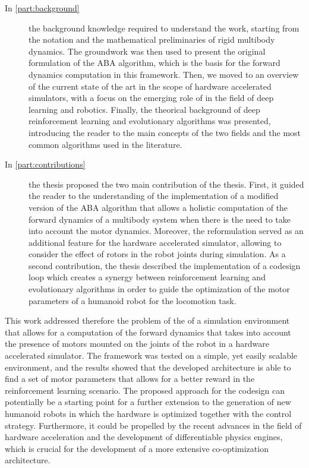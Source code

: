 \begin{description}
    \item[In \cref{part:background}] the background knowledge required to understand the work, starting from the notation and the mathematical preliminaries of rigid multibody dynamics. The groundwork was then used to present the original formulation of the \ac{ABA} algorithm, which is the basis for the forward dynamics computation in this framework. Then, we moved to an overview of the current state of the art in the scope of hardware accelerated simulators, with a focus on the emerging role of \jax in the field of deep learning and robotics. Finally, the theorical background of deep reinforcement learning and evolutionary algorithms was presented, introducing the reader to the main concepts of the two fields and the most common algorithms used in the literature.
    \item[In \cref{part:contributions}] the thesis proposed the two main contribution of the thesis. First, it guided the reader to the understanding of the implementation of a modified version of the \ac{ABA} algorithm that allows a holistic computation of the forward dynamics of a multibody system when there is the need to take into account the motor dynamics. Moreover, the reformulation served as an additional feature for the hardware accelerated \jaxsim simulator, allowing to consider the effect of rotors in the robot joints during simulation. As a second contribution, the thesis described the implementation of a codesign loop which creates a synergy between reinforcement learning and evolutionary algorithms in order to guide the optimization of the motor parameters  of a humanoid robot for the locomotion task.
\end{description}

This work addressed therefore the problem of the  of a simulation environment that allows for a computation of the forward dynamics that takes into account the presence of motors mounted on the joints of the robot in a hardware accelerated simulator. The framework was tested on a simple, yet easily scalable environment, and the results showed that the developed architecture is able to find a set of motor parameters that allows for a better reward in the reinforcement learning scenario.
The proposed approach for the codesign can potentially be a starting point for a further extension to the generation of new humanoid robots in which the hardware is optimized together with the control strategy. Furthermore, it could be propelled by the recent advances in the field of hardware acceleration and the development of differentiable physics engines, which is crucial for the development of a more extensive co-optimization architecture.
